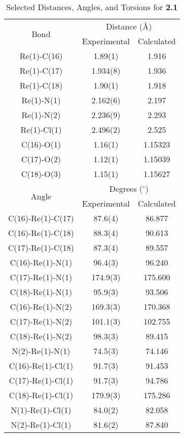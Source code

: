 \begin{table}[htbp]
  \caption{Selected Distances, Angles, and Torsions for \textbf{2.1}}
  \centering
    \begin{tabular}{ccc}
    \toprule
    \multirow{2}{*}{Bond} & \multicolumn{2}{c}{Distance (\r{A})} \\ \cline{2-3}
     & Experimental & Calculated \\ \midrule
    Re(1)-C(16) & 1.89(1) & 1.916 \\
    Re(1)-C(17) & 1.934(8) & 1.936 \\
    Re(1)-C(18) & 1.90(1) & 1.918 \\
    Re(1)-N(1) & 2.162(6) & 2.197 \\
    Re(1)-N(2) & 2.236(9) & 2.293 \\
    Re(1)-Cl(1) & 2.496(2) & 2.525 \\ 
    C(16)-O(1) & 1.16(1) & 1.15323 \\
    C(17)-O(2) & 1.12(1) & 1.15039 \\
    C(18)-O(3) & 1.15(1) & 1.15627 \\ \midrule
    \multirow{2}{*}{Angle} & \multicolumn{2}{c}{Degrees ($^\circ$)} \\ \cline{2-3}
     & Experimental & Calculated \\ \midrule
    C(16)-Re(1)-C(17) & 87.6(4) & 86.877 \\
    C(16)-Re(1)-C(18) & 88.3(4) & 90.613 \\
    C(17)-Re(1)-C(18) & 87.3(4) & 89.557 \\
    C(16)-Re(1)-N(1) & 96.4(3) & 96.240 \\
    C(17)-Re(1)-N(1) & 174.9(3) & 175.600 \\
    C(18)-Re(1)-N(1) & 95.9(3) & 93.506 \\
    C(16)-Re(1)-N(2) & 169.3(3) & 170.368 \\
    C(17)-Re(1)-N(2) & 101.1(3) & 102.755 \\
    C(18)-Re(1)-N(2) & 98.3(3) & 89.415 \\
    N(2)-Re(1)-N(1) & 74.5(3) & 74.146 \\
    C(16)-Re(1)-Cl(1) & 91.7(3) & 91.453 \\
    C(17)-Re(1)-Cl(1) & 91.7(3) & 94.786 \\
    C(18)-Re(1)-Cl(1) & 179.9(3) & 175.286 \\
    N(1)-Re(1)-Cl(1) & 84.0(2) & 82.058 \\
    N(2)-Re(1)-Cl(1) & 81.6(2) & 87.840 \\

\end{tabular}
\end{table}
